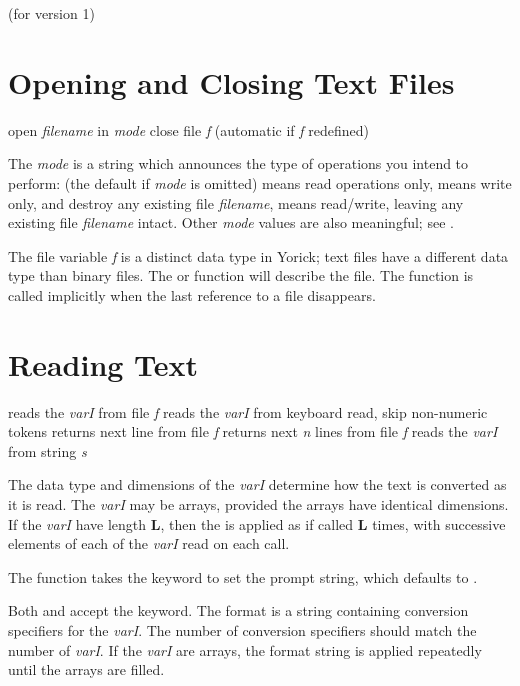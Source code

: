 \centerline{(for version 1)}

\section{Opening and Closing Text Files}

     {open {\it filename\/} in {\it mode}}
     {close file {\it f} (automatic if {\it f\/} redefined)}

The {\it mode} is a string which announces the type of operations you
intend to perform:  (the default if {\it mode\/} is omitted)
means read operations only,  means write only, and destroy any
existing file {\it filename},  means read/write, leaving any
existing file {\it filename\/} intact.  Other {\it mode\/} values are
also meaningful; see .

The file variable {\it f\/} is a distinct data type in Yorick; text
files have a different data type than binary files.  The 
or  function will describe the file.  The 
function is called implicitly when the last reference to a file disappears.

\section{Reading Text}

     {reads the {\it varI} from file {\it f}}
     {reads the {\it varI\/} from keyboard}
     {read, skip non-numeric tokens}
     {returns next line from file {\it f}}
     {returns next {\it n\/} lines from file {\it f}}
     {reads the {\it varI\/} from string {\it s}}

The data type and dimensions of the {\it varI\/} determine how the text
is converted as it is read.  The {\it varI\/} may be arrays, provided the
arrays have identical dimensions.  If the {\it varI\/} have length {\bf L},
then the  is applied as if  called {\bf L} times, with successive
elements of each of the {\it varI\/} read on each call.

The  function takes the  keyword to set the prompt
string, which defaults to .

Both  and  accept the  keyword.  The
format is a string containing conversion specifiers for the {\it varI}.
The number of conversion specifiers should match the number of {\it varI}.
If the {\it varI\/} are arrays, the format string is applied repeatedly
until the arrays are filled.

